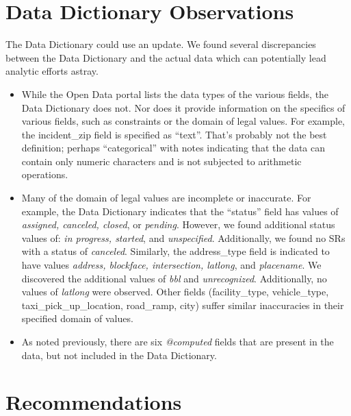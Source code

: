 \documentclass[12pt, titlepage]{article}
\begin{document}
\section{Data Dictionary Observations} 
\label{sec:datadictionary}
The Data Dictionary could use an update. We found several 
discrepancies between the Data Dictionary and the 
actual data which can potentially lead analytic efforts astray. 

\begin{itemize}
	\item While the Open Data portal lists the data types of the 
	various fields, the Data Dictionary does not. Nor does it provide 
	information on the specifics of various fields, such 
	as constraints or the domain of legal values. For example, the 
	incident\_zip field is specified as ``text''. That's probably not the 
	best definition; perhaps	``categorical'' with notes indicating that 
	the data can contain only numeric characters and is 
	not subjected to arithmetic operations. 

	\item Many of the domain of legal values are incomplete or 
	inaccurate. For example, the Data Dictionary indicates that 
	the ``status'' field has values of \textit{assigned, canceled, closed}, 
	or \textit{pending}. However, we found additional status 
	values of: \textit{in progress, started}, and \textit{unspecified}. 
	Additionally, we found no SRs with a status of \textit{canceled}. 
	Similarly, the address\_type field is indicated to have 
	values \textit{address, blockface, intersection, latlong}, and 
	\textit{placename}. We discovered the additional values of 
	\textit{bbl} and \textit{unrecognized}. Additionally, no values of 
	\textit{latlong} were observed. Other fields (facility\_type, 
	vehicle\_type, taxi\_pick\_up\_location, road\_ramp, city) 
	suffer similar inaccuracies in their specified domain of values.
	
	\item As noted previously, there are six \textit{@computed} fields that
	are present in the data, but not included in the Data Dictionary.
\end{itemize}



\section{Recommendations} 
\label{sec:recommendations}
\end{document}
